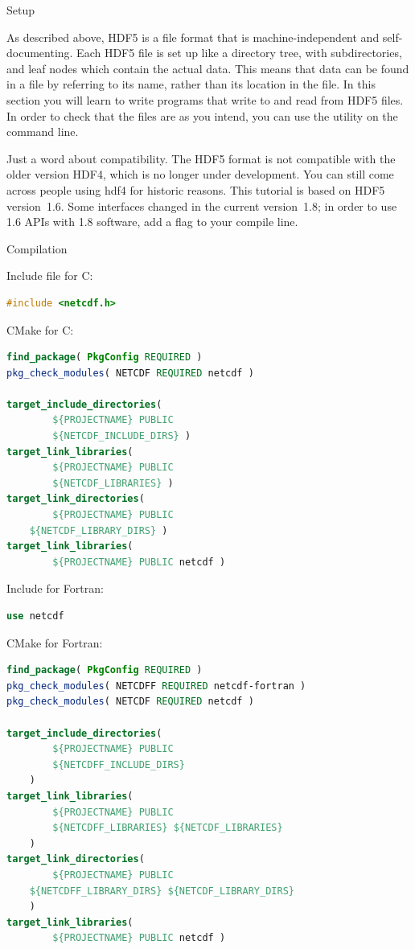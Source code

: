  {Setup}

As described above, HDF5 is a file format that is machine-independent
and self-documenting. Each HDF5 file is set up like a directory tree,
with subdirectories, and leaf nodes which contain the actual
data. This means that data can be found in a file by referring to its
name, rather than its location in the file. In this section you will
learn to write programs that write to and read from HDF5 files. In
order to check that the files are as you intend, you can use the
 utility on the command line.

Just a word about compatibility. The HDF5 format is not compatible
with the older version HDF4, which is no longer under development. You
can still come across people using hdf4 for historic reasons. This
tutorial is based on HDF5 version~1.6. Some interfaces changed in the
current version~1.8; in order to use 1.6 APIs with 1.8 software, add a
flag  to your compile line.

 {Compilation}

Include file for C:
\begin{lstlisting}[language=cpp]
#include <netcdf.h>
\end{lstlisting}
CMake for C:
\begin{lstlisting}[language=CMake]
find_package( PkgConfig REQUIRED )
pkg_check_modules( NETCDF REQUIRED netcdf )

target_include_directories(
        ${PROJECTNAME} PUBLIC
        ${NETCDF_INCLUDE_DIRS} )
target_link_libraries(
        ${PROJECTNAME} PUBLIC
        ${NETCDF_LIBRARIES} )
target_link_directories(
        ${PROJECTNAME} PUBLIC
	${NETCDF_LIBRARY_DIRS} )
target_link_libraries(
        ${PROJECTNAME} PUBLIC netcdf )
\end{lstlisting}
Include for Fortran:
\begin{lstlisting}[language=Fortran]
use netcdf
\end{lstlisting}
CMake for Fortran:
\begin{lstlisting}[language=CMake]
find_package( PkgConfig REQUIRED )
pkg_check_modules( NETCDFF REQUIRED netcdf-fortran )
pkg_check_modules( NETCDF REQUIRED netcdf )

target_include_directories(
        ${PROJECTNAME} PUBLIC
        ${NETCDFF_INCLUDE_DIRS}
	)
target_link_libraries(
        ${PROJECTNAME} PUBLIC
        ${NETCDFF_LIBRARIES} ${NETCDF_LIBRARIES}
	)
target_link_directories(
        ${PROJECTNAME} PUBLIC
	${NETCDFF_LIBRARY_DIRS}	${NETCDF_LIBRARY_DIRS}
	)
target_link_libraries(
        ${PROJECTNAME} PUBLIC netcdf )
\end{lstlisting}


